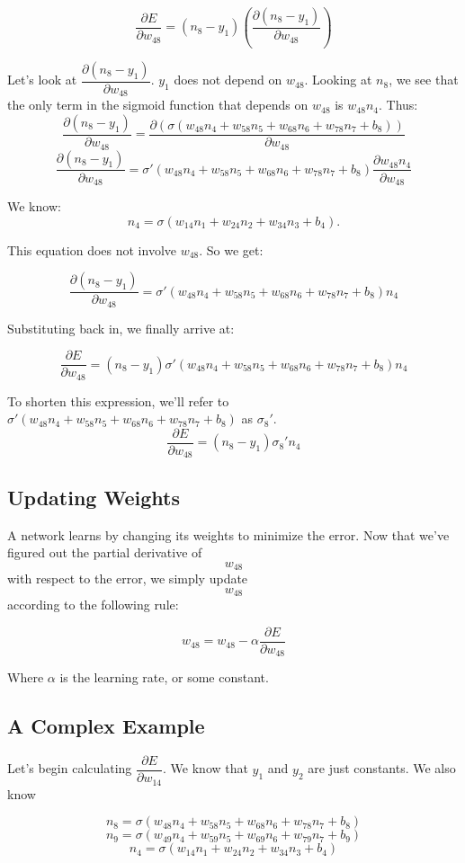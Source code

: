 \documentclass{article}
\begin{document}
\[\dfrac{\partial E}{\partial w_{48}} = (n_8-y_1)\left(\frac{\partial{(n_8-y_1)}}{\partial w_{48}}\right)\]

Let's look at $\dfrac{\partial{(n_8-y_1)}}{\partial w_{48}}$. $y_1$ does not depend on $w_{48}$. Looking at $n_8$, we see that the only term in the sigmoid function that depends on $w_{48}$ is $w_{48}n_4$. Thus:
\[\frac{\partial{(n_8-y_1)}}{\partial w_{48}} = \frac{\partial{(\sigma(w_{48}n_4 + w_{58}n_5 + w_{68}n_6 + w_{78}n_7 + b_8))}}{\partial w_{48}}\]
\[\frac{\partial{(n_8-y_1)}}{\partial w_{48}} = \sigma'(w_{48}n_4 + w_{58}n_5 + w_{68}n_6 + w_{78}n_7 + b_8)\frac{\partial{w_{48}n_4}}{\partial w_{48}}\]

We know:
\[n_4 = \sigma(w_{14}n_1 + w_{24}n_2 + w_{34}n_3 + b_4).\]

This equation does not involve $w_{48}$. So we get:

\[\frac{\partial{(n_8-y_1)}}{\partial w_{48}} = \sigma'(w_{48}n_4 + w_{58}n_5 + w_{68}n_6 + w_{78}n_7 + b_8)n_4\]

Substituting back in, we finally arrive at:

\[\dfrac{\partial E}{\partial w_{48}} = (n_8-y_1)\sigma'(w_{48}n_4 + w_{58}n_5 + w_{68}n_6 + w_{78}n_7 + b_8)n_4\]

To shorten this expression, we'll refer to $\sigma'(w_{48}n_4 + w_{58}n_5 + w_{68}n_6 + w_{78}n_7 + b_8)$ as $\sigma_8'$.
\[\dfrac{\partial E}{\partial w_{48}} = (n_8-y_1)\sigma_8'n_4\]

\subsection{Updating Weights}
A network learns by changing its weights to minimize the error. Now that we've figured out the partial derivative of $$w_{48}$$ with respect to the error, we simply update $$w_{48}$$ according to the following rule:

\[w_{48} = w_{48} - \alpha\dfrac{\partial E}{\partial w_{48}}\]

Where $\alpha$ is the learning rate, or some constant.

\subsection{A Complex Example}
Let's begin calculating $\dfrac{\partial E}{\partial w_{14}}$. We know that $y_1$ and $y_2$ are just constants. We also know

\[n_8 = \sigma(w_{48}n_4 + w_{58}n_5 + w_{68}n_6 + w_{78}n_7 + b_8)\]
\[n_9 = \sigma(w_{49}n_4 + w_{59}n_5 + w_{69}n_6 + w_{79}n_7 + b_9)\]
\[n_4 = \sigma(w_{14}n_1 + w_{24}n_2 + w_{34}n_3 + b_4)\]
\end{document}
